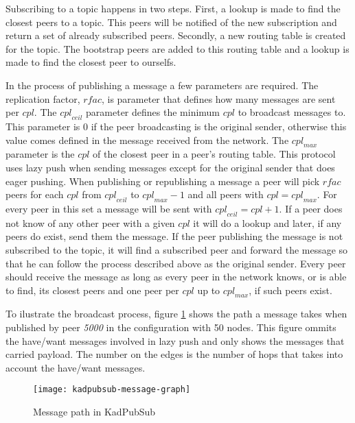 \documentclass[sigconf]{acmart}
\begin{document}
Subscribing to a topic happens in two steps.
First, a lookup is made to find the closest peers to a topic.
This peers will be notified of the new subscription and return a set of already subscribed peers.
Secondly, a new routing table is created for the topic. The bootstrap peers are added to this routing table and a lookup is made to find the closest peer to ourselfs.

In the process of publishing a message a few parameters are required.
The replication factor, $\mathit{rfac}$, is parameter that defines how many messages are sent per $\mathit{cpl}$.
The $\mathit{cpl}_{ceil}$ parameter defines the minimum $\mathit{cpl}$ to broadcast messages to. This parameter is $0$ if the peer broadcasting is the original sender, otherwise this value comes defined in the message received from the network.
The $\mathit{cpl}_{max}$ parameter is the $cpl$ of the closest peer in a peer's routing table.
This protocol uses lazy push when sending messages except for the original sender that does eager pushing.
When publishing or republishing a message a peer will pick $\mathit{rfac}$ peers for each $\mathit{cpl}$ from $\mathit{cpl}_{ceil}$ to $\mathit{cpl}_{max} - 1$ and all peers with $\mathit{cpl} = \mathit{cpl}_{max}$.
For every peer in this set a message will be sent with $\mathit{cpl}_{ceil} = \mathit{cpl} + 1$. If a peer does not know of any other peer with a given $\mathit{cpl}$ it will do a lookup and later, if any peers do exist, send them the message.
If the peer publishing the message is not subscribed to the topic, it will find a subscribed peer and forward the message so that he can follow the process described above as the original sender.
Every peer should receive the message as long as every peer in the network knows, or is able to find, its closest peers and one peer per $\mathit{cpl}$ up to $\mathit{cpl}_{max}$, if such peers exist.

To ilustrate the broadcast process, figure \ref{fig:kadpubsub-message-graph} shows the path a message takes when published by peer \textit{5000} in the configuration with 50 nodes. This figure ommits the have/want messages involved in lazy push and only shows the messages that carried payload. The number on the edges is the number of hops that takes into account the have/want messages.

\begin{figure}[h]
    \centering
    \texttt{[image: kadpubsub-message-graph]}
    \caption{Message path in KadPubSub}
    \label{fig:kadpubsub-message-graph}
\end{figure}
\end{document}
